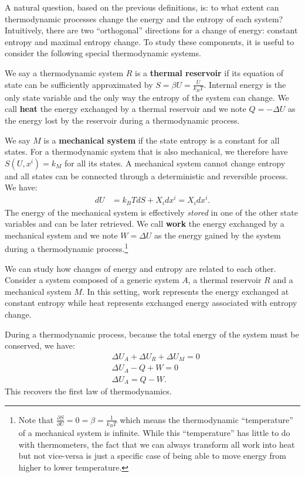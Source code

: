 \documentclass[letterpaper,twocolumn]{article}
\begin{document}
A natural question, based on the previous definitions, is: to what extent can thermodynamic processes change the energy and the entropy of each system? Intuitively, there are two ``orthogonal'' directions for a change of energy: constant entropy and maximal entropy change. To study these components, it is useful to consider the following special thermodynamic systems.

We say a thermodynamic system $R$ is a \textbf{thermal reservoir} if its equation of state can be sufficiently approximated by $S = \beta U = \frac{U}{k_B T}$. Internal energy is the only state variable and the only way the entropy of the system can change. We call \textbf{heat} the energy exchanged by a thermal reservoir and we note $Q = - \Delta U$ as the energy lost by the reservoir during a thermodynamic process.

We say $M$ is a \textbf{mechanical system} if the state entropy is a constant for all states. For a thermodynamic system that is also mechanical, we therefore have  $S(U, x^i) = k_M$ for all its states. A mechanical system cannot change entropy and all states can be connected through a deterministic and reversible process. We have:
\begin{equation}
\begin{aligned}
dU &= k_B T dS + X_i dx^i = X_i dx^i.
\end{aligned}
\end{equation}
The energy of the mechanical system is effectively \emph{stored} in one of the other state variables and can be later retrieved. We call \textbf{work} the energy exchanged by a mechanical system and we note $W=\Delta U$ as the energy gained by the system during a thermodynamic process.\footnote{Note that $\frac{\partial S}{\partial U} = 0 = \beta = \frac{1}{k_B T}$ which means the thermodynamic ``temperature'' of a mechanical system is infinite. While this ``temperature'' has little to do with thermometers, the fact that we can always transform all work into heat but not vice-versa is just a specific case of being able to move energy from higher to lower temperature.}

We can study how changes of energy and entropy are related to each other. Consider a system composed of a generic system $A$, a thermal reservoir $R$ and a mechanical system $M$. In this setting, work represents the energy exchanged at constant entropy while heat represents exchanged energy associated with entropy change.

During a thermodynamic process, because the total energy of the system must be conserved, we have:
\begin{equation}
\begin{aligned}
&\Delta U_A + \Delta U_R + \Delta U_M = 0 \\
&\Delta U_A - Q + W = 0 \\
&\Delta U_A = Q - W.
\end{aligned}
\end{equation}
This recovers the first law of thermodynamics.
\end{document}
